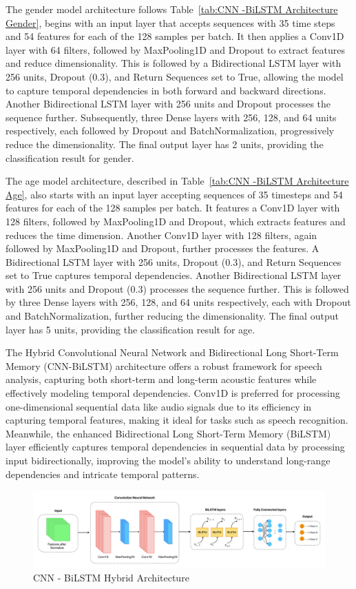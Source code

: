 \documentclass[conference, 10pt,onecolumn]{IEEEtran}
\begin{document}
The gender model architecture follows Table~\ref{tab:CNN -BiLSTM Architecture Gender}, begins with an input layer that accepts sequences with 35 time steps and 54 features for each of the 128 samples per batch. It then applies a Conv1D layer with 64 filters, followed by MaxPooling1D and Dropout to extract features and reduce dimensionality. This is followed by a Bidirectional LSTM layer with 256 units, Dropout (0.3), and Return Sequences set to True, allowing the model to capture temporal dependencies in both forward and backward directions. Another Bidirectional LSTM layer with 256 units and Dropout processes the sequence further. Subsequently, three Dense layers with 256, 128, and 64 units respectively, each followed by Dropout and BatchNormalization, progressively reduce the dimensionality. The final output layer has 2 units, providing the classification result for gender.

The age model architecture, described in Table~\ref{tab:CNN -BiLSTM Architecture Age}, also starts with an input layer accepting sequences of 35 timesteps and 54 features for each of the 128 samples per batch. It features a Conv1D layer with 128 filters, followed by MaxPooling1D and Dropout, which extracts features and reduces the time dimension. Another Conv1D layer with 128 filters, again followed by MaxPooling1D and Dropout, further processes the features. A Bidirectional LSTM layer with 256 units, Dropout (0.3), and Return Sequences set to True captures temporal dependencies. Another Bidirectional LSTM layer with 256 units and Dropout (0.3) processes the sequence further. This is followed by three Dense layers with 256, 128, and 64 units respectively, each with Dropout and BatchNormalization, further reducing the dimensionality. The final output layer has 5 units, providing the classification result for age.

The Hybrid Convolutional Neural Network and Bidirectional Long Short-Term Memory (CNN-BiLSTM) architecture offers a robust framework for speech analysis, capturing both short-term and long-term acoustic features while effectively modeling temporal dependencies. Conv1D is preferred for processing one-dimensional sequential data like audio signals due to its efficiency in capturing temporal features, making it ideal for tasks such as speech recognition. Meanwhile, the enhanced Bidirectional Long Short-Term Memory (BiLSTM) layer efficiently captures temporal dependencies in sequential data by processing input bidirectionally, improving the model's ability to understand long-range dependencies and intricate temporal patterns.
\begin{figure}
    \centering
    \includegraphics[width=7 in]{CNN-BiLSTM architecture.pdf}
    \caption{CNN - BiLSTM Hybrid Architecture}
    \label{fig:CNN - BiLSTM Hybrid Architecture}
\end{figure}
\end{document}

